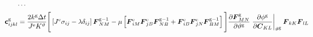 \documentclass[10pt,letterpaper,oneside]{report}
\newcommand{\ten}[1]{\mbox{\boldmath $#1$}{}}
\newcommand{\tenf}[1]{\mbox{{\sffamily{\bfseries {#1}}}}}
\newcommand{\scas}[1]{\mbox{{\scriptsize{${\rm{#1}}$}}}{}}
\begin{document}
\begin{align}
\cdots{}& \notag \\
\tenf{c}^{\scas{g}}_{ijkl} ={}& \frac{2 k^{\scas{g}} \Delta t}{ J^{\scas{e}} K^\vartheta } \Bigg[ \left[ J^{\scas{e}} \sigma_{ij} - \lambda \delta_{ij} \right] \ten{F}^{\scas{g}-1}_{NM} - \mu \left[ \ten{F}^{\scas{e}}_{iM} \ten{F}^{\scas{e}}_{jB} \ten{F}^{\scas{g}-1}_{NB} + \ten{F}^{\scas{e}}_{iB} \ten{F}^{\scas{e}}_{jN} \ten{F}^{\scas{g}-1}_{BM} \right] \Bigg] 
\frac{\partial \ten{F}^{\scas{g}}_{MN}}{\partial \vartheta^{\scas{g}}} \left. \frac{\partial \phi^{\scas{g}} }{\partial \ten{C}_{KL}} \right|_{\vartheta^{\scas{g}}} \ten{F}_{kK} \ten{F}_{lL} 
\label{neohook_growth_tangent}
\\

\end{align}
\end{document}
